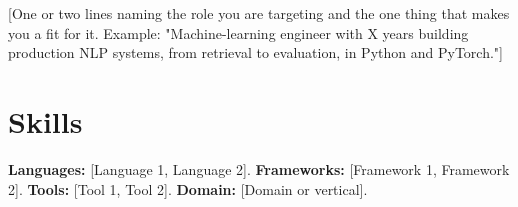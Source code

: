 \documentclass[10pt,a4paper,sans]{moderncv}
\begin{document}
\makecvtitle


\vspace{4pt}
\small{[One or two lines naming the role you are targeting and the one thing that makes you a fit for it. Example: "Machine-learning engineer with X years building production NLP systems, from retrieval to evaluation, in Python and PyTorch."]}


\section{Skills}
\vspace{1pt}
\small{\textbf{Languages:} [Language 1, Language 2]. \textbf{Frameworks:} [Framework 1, Framework 2]. \textbf{Tools:} [Tool 1, Tool 2]. \textbf{Domain:} [Domain or vertical].}

\end{document}
